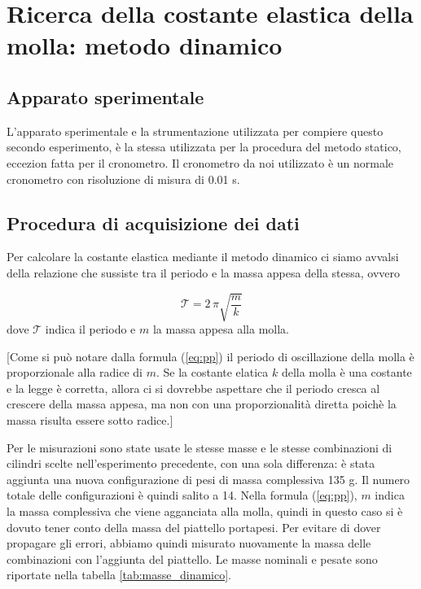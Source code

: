 \section{Ricerca della costante elastica della molla: metodo dinamico}

\subsection{Apparato sperimentale}

L'apparato sperimentale e la strumentazione utilizzata per compiere questo secondo esperimento, è la stessa utilizzata per la procedura del metodo statico, eccezion fatta per il cronometro. Il cronometro da noi utilizzato è un normale cronometro con risoluzione di misura di 0.01 s.

\subsection{Procedura di acquisizione dei dati}

Per calcolare la costante elastica mediante il metodo dinamico ci siamo avvalsi della relazione che sussiste tra il periodo e la massa appesa della stessa, ovvero

\begin{equation}
	\mathcal{T} = {2\,\pi}{\sqrt{\frac{m}{k}}}
    \label{eq:pp}
\end{equation}
%
dove $\mathcal{T}$ indica il periodo e $m$ la massa appesa alla molla.

[Come si può notare dalla formula (\ref{eq:pp}) il periodo di oscillazione della molla è proporzionale alla radice di $m$. Se la costante elatica $k$ della molla è una costante e la legge è corretta, allora ci si dovrebbe aspettare che il periodo cresca al crescere della massa appesa, ma non con una proporzionalità diretta poichè la massa risulta essere sotto radice.]

Per le misurazioni sono state usate le stesse masse e le stesse combinazioni di cilindri scelte nell'esperimento precedente, con una sola differenza: è stata aggiunta una nuova configurazione di pesi di massa complessiva 135 g. Il numero totale delle configurazioni è quindi salito a 14.
Nella formula (\ref{eq:pp}), $m$ indica la massa complessiva che viene agganciata alla molla, quindi in questo caso si è dovuto tener conto della massa del piattello portapesi. Per evitare di dover propagare gli errori, abbiamo quindi misurato nuovamente la massa delle combinazioni
con l'aggiunta del piattello. Le masse nominali e pesate sono riportate nella tabella \ref{tab:masse_dinamico}.

